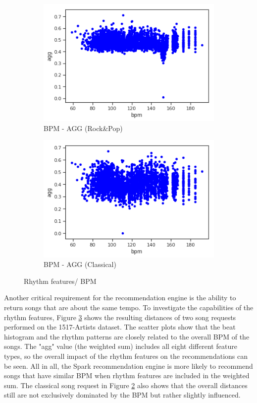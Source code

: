 \begin{figure}[htbp]
{{			\begin{subfigure}{.495\textwidth}
				\centering			
				\includegraphics[scale=0.5]{Images/SparkFeat/bpm_agg_hip.png}	
				\caption{BPM - AGG (Rock\&Pop)}
				\label{fig:arbpm}
			\end{subfigure}		
			\begin{subfigure}{.495\textwidth}
				\centering			
				\includegraphics[scale=0.5]{Images/SparkFeat/bpm_agg_clas.png}	
				\caption{BPM - AGG (Classical)}
				\label{fig:acbpm}
			\end{subfigure}%
	}}
	\caption{Rhythm features/ BPM}
	\label{fig:rhythmfeat}
\end{figure}
\FloatBarrier

\noindent Another critical requirement for the recommendation engine is the ability to return songs that are about the same tempo. To investigate the capabilities of the rhythm features, Figure \ref{fig:rhythmfeat} shows the resulting distances of two song requests performed on the 1517-Artists dataset.
\noindent The scatter plots show that the beat histogram and the rhythm patterns are closely related to the overall BPM of the songs. The "agg" value (the weighted sum) includes all eight different feature types, so the overall impact of the rhythm features on the recommendations can be seen. All in all, the Spark recommendation engine is more likely to recommend songs that have similar BPM when rhythm features are included in the weighted sum. The classical song request in Figure \ref{fig:acbpm} also shows that the overall distances still are not exclusively dominated by the BPM but rather slightly influenced. 

